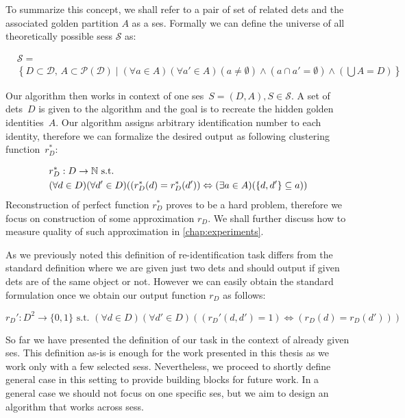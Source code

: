 To summarize this concept, we shall refer to a pair of set of related 
\glspl{det} and the associated golden partition $A$ as a \gls{ses}. Formally
we can define the universe of all theoretically possible \glspl{ses}
$\mathcal{S}$ as:

\begin{equation*}
\begin{split}
&\mathcal{S} =\\& \left\{D \subset \mathcal{D},\,A \subset \mathcal{P(D)} \mid (\forall a \in A) (\forall a' \in A) (a \neq \emptyset) \land (a \cap a' = \emptyset) \land \left(\bigcup A = D\right)\right\}    
\end{split}
\end{equation*}


Our algorithm then works in context of one
\gls{ses}~$S = (D, A), S \in \mathcal{S}$. A set of \glspl{det}~$D$ is given to 
the  algorithm and the goal is to recreate the hidden golden identities~$A$.
Our algorithm assigns arbitrary identification number to each identity,
therefore we can formalize the desired output as following clustering
function~$r_D^*$:

\begin{equation}
\begin{split}
&r_D^*: D \rightarrow \mathbb{N} \text{ s.t. }\\
&(\forall d \in D) (\forall d' \in D) ((r_D^*(d) = r_D^*(d')) \Leftrightarrow (\exists a \in A) (\{d, d'\} \subseteq a))
\label{eq:reidentification}
\end{split}
\end{equation}
Reconstruction of perfect function $r_D^*$ proves to be a hard problem, 
therefore we focus on construction of some approximation $r_D$. We shall further discuss how to measure quality of such approximation in
\autoref{chap:experiments}.

As we previously noted this definition of re-identification task differs from
the standard definition where we are given just two \glspl{det} and should
output if given \glspl{det} are of the same object or not. However we can easily
obtain the standard formulation once we obtain our output function $r_D$ as
follows:

$$
r_D' : D^2 \to \{0, 1\} \text{ s.t. } (\forall d \in D) (\forall d' \in D) ((r_D'(d, d') = 1) \Leftrightarrow (r_D(d) = r_D(d')))
$$

So far we have presented the definition of our task in the context of already
given \gls{ses}.
This definition as-is is enough for the work presented in this thesis as we work
only with a few selected \glspl{ses}. Nevertheless, we proceed to shortly define
general case in this setting to provide building blocks for future work.
In a general case we should not focus on one specific \gls{ses}, but
we aim to design an algorithm that works across \glspl{ses}.

